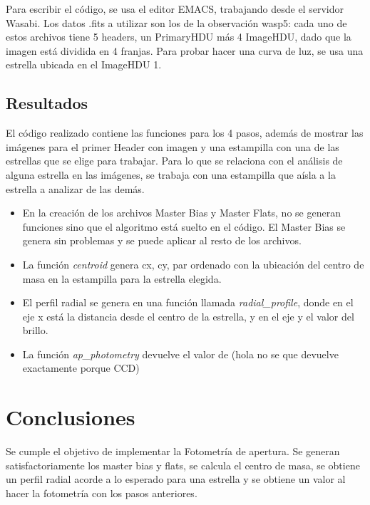 \documentclass[a4paper, 11pt, spanish]{article}
\begin{document}
Para escribir el c\'odigo, se usa el editor EMACS, trabajando desde el servidor Wasabi. Los datos .fits a utilizar son los de la observaci\'on wasp5: cada uno de estos archivos tiene 5 headers, un PrimaryHDU m\'as 4 ImageHDU, dado que la imagen est\'a dividida en 4 franjas. Para probar hacer una curva de luz, se usa una estrella ubicada en el ImageHDU 1.


\subsection{Resultados}

El c\'odigo realizado contiene las funciones para los 4 pasos, adem\'as de mostrar las im\'agenes para el primer Header con imagen y una estampilla con una de las estrellas que se elige para trabajar. Para lo que se relaciona con el an\'alisis de alguna estrella en las im\'agenes, se trabaja con una estampilla que a\'isla a la estrella a analizar de las dem\'as.

\begin{itemize}
	\item En la creaci\'on de los archivos Master Bias y Master Flats, no se generan funciones sino que el algoritmo est\'a suelto en el c\'odigo. El Master Bias se genera sin problemas y se puede aplicar al resto de los archivos.
	\item La funci\'on \textit{centroid} genera cx, cy, par ordenado con la ubicaci\'on del centro de masa en la estampilla para la estrella elegida. 
	\item El perfil radial se genera en una funci\'on llamada \textit{radial\_profile}, donde en el eje x est\'a la distancia desde el centro de la estrella, y en el eje y el valor del brillo. 
	\item La funci\'on \textit{ap\_photometry} devuelve el valor de (hola no se que devuelve exactamente porque CCD)
\end{itemize}


\section{Conclusiones}

Se cumple el objetivo de implementar la Fotometr\'ia de apertura. Se generan satisfactoriamente los master bias y flats, se calcula el centro de masa, se obtiene un perfil radial acorde a lo esperado para una estrella y se obtiene un valor al hacer la fotometr\'ia con los pasos anteriores.
\end{document}
